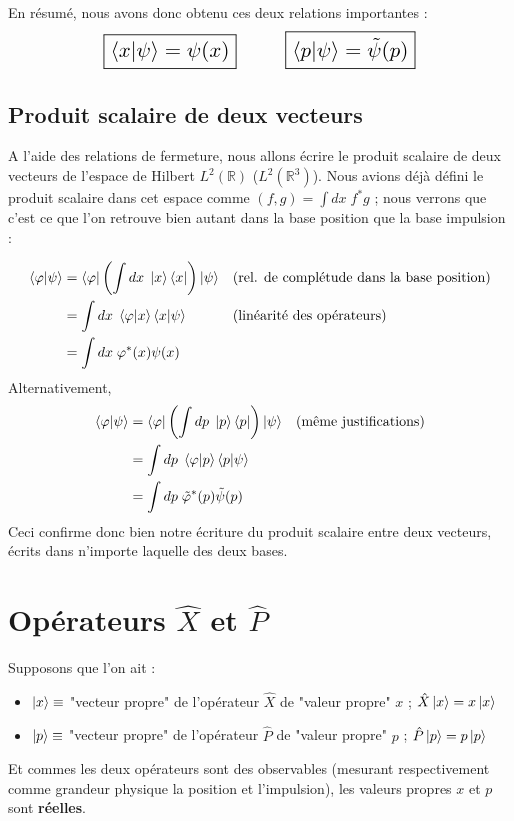 \documentclass[../notesdecours]{subfiles}
\begin{document}
En résumé, nous avons donc obtenu ces deux relations importantes :
$$
\scalebox{1.5}{
	\boxed{\braket{x|\psi} = \psi(x)}
	\qquad 
	\boxed{ \braket{p|\psi} = \tilde{\psi}(p)}
}
$$



\subsection{Produit scalaire de deux vecteurs}
A l'aide des relations de fermeture, nous allons écrire le produit scalaire de deux vecteurs de l'espace de Hilbert $L^2(\mathbb{R})$ ($L^2(\mathbb{R}^3)$). Nous avions déjà défini le produit scalaire dans cet espace comme $(f,g) = \int dx \; f^* g$ ; nous verrons que c'est ce que l'on retrouve bien autant dans la base position que la base impulsion : 

\begin{align}
	\braket{\varphi | \psi} &= \bra{\varphi} \left( \int dx \; \ket{x}\bra{x} \right) \ket{\psi}  && \text{(rel. de complétude dans la base position)} \notag\\
	&= \int dx \; \braket{\varphi |x}\braket{x|\psi} && \text{(linéarité des opérateurs)} \notag \\
        &= \int dx \; \varphi^*(x)\psi(x) \notag
\end{align}
Alternativement,
\begin{align}
	\braket{\varphi | \psi} &= \bra{\varphi} \left( \int dp \; \ket{p}\bra{p} \right) \ket{\psi} && \text{(même justifications)}\notag\\
        &= \int dp \; \braket{\varphi |p}\braket{p|\psi} \notag\\
        &= \int dp \; \tilde{\varphi}^*(p)\tilde{\psi}(p)\notag
\end{align}
Ceci confirme donc bien notre écriture du produit scalaire entre deux vecteurs, écrits dans n'importe laquelle des deux bases.
\section{Opérateurs $\hat{X}$ et $\hat{P}$}

Supposons que l'on ait : \begin{itemize}[label=\textbullet]
    \item $\ket{x} \equiv$ "vecteur propre" de l'opérateur $\hat{X}$ de "valeur propre" $x$ ; $\hat{X}\ket{x} = x\ket{x}$
    \item $\ket{p} \equiv$ "vecteur propre" de l'opérateur $\hat{P}$ de "valeur propre" $p$ ; $\hat{P}\ket{p} = p\ket{p}$
\end{itemize}
Et commes les deux opérateurs sont des observables (mesurant respectivement comme grandeur physique la position et l'impulsion), les valeurs propres $x$ et $p$ sont \textbf{réelles}. \\
\end{document}

